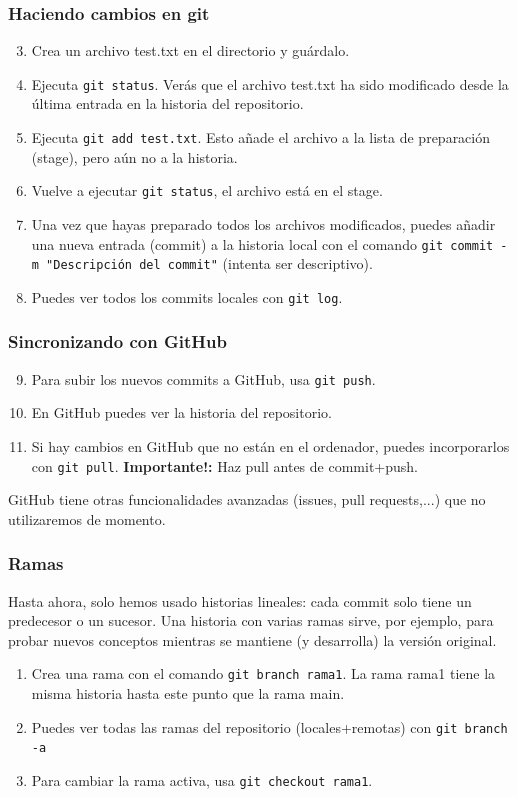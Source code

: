 \documentclass[mathserif, 10pt]{beamer}
\begin{document}
\begin{frame}\frametitle{Haciendo cambios en git}
\begin{enumerate}\setcounter{enumi}{2}
\item Crea un archivo test.txt en el directorio y guárdalo.
\item Ejecuta \texttt{git status}. Verás que el archivo test.txt ha sido modificado desde la última entrada en la historia del repositorio.
\item Ejecuta \texttt{git add test.txt}. Esto añade el archivo a la lista de preparación (stage), pero aún no a la historia.
\item Vuelve a ejecutar \texttt{git status}, el archivo está en el stage.
\item Una vez que hayas preparado todos los archivos modificados, puedes añadir una nueva entrada (commit) a la historia local con el comando \texttt{git commit -m "Descripción del commit"} (intenta ser descriptivo).
\item Puedes ver todos los commits locales con \texttt{git log}.
\end{enumerate}
    

\end{frame}

\begin{frame}\frametitle{Sincronizando con GitHub}
    \begin{enumerate}\setcounter{enumi}{8}
        \item Para subir los nuevos commits a GitHub, usa \texttt{git push}.
        \item En GitHub puedes ver la historia del repositorio.
        \item Si hay cambios en GitHub que no están en el ordenador, puedes incorporarlos con \texttt{git pull}. \textbf{Importante!:} Haz pull antes de commit+push.
    \end{enumerate}

    GitHub tiene otras funcionalidades avanzadas (issues, pull requests,...) que no utilizaremos de momento.

\end{frame}

\begin{frame}\frametitle{Ramas}
    Hasta ahora, solo hemos usado historias lineales: cada commit solo tiene un predecesor o un sucesor. Una historia con varias ramas sirve, por ejemplo, para probar nuevos conceptos mientras se mantiene (y desarrolla) la versión original.

    \begin{enumerate}
        \item Crea una rama con el comando \texttt{git branch rama1}. La rama rama1 tiene la misma historia hasta este punto que la rama main.
        \item Puedes ver todas las ramas del repositorio (locales+remotas) con \texttt{git branch -a}
        \item Para cambiar la rama activa, usa \texttt{git checkout rama1}.
    \end{enumerate}

\end{frame}
\end{document}

